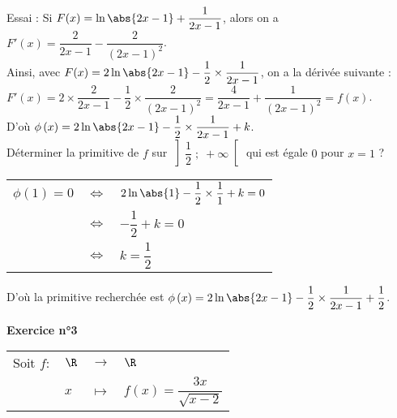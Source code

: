 Essai : Si $F(x) = \ln \abs{2x-1} + \dfrac{1}{2x-1}$, alors on a $F'(x) = \dfrac{2}{2x-1} - \dfrac{2}{\left(2x-1\right)^2}$. \vspace*{.3cm} \\

Ainsi, avec $F(x) = 2\ln\abs{2x-1} - \dfrac{1}{2} \times \dfrac{1}{2x-1}$, on a la dérivée suivante : \vspace*{.3cm} \\

$F'(x) = 2\times \dfrac{2}{2x-1} - \dfrac{1}{2} \times \dfrac{2}{\left(2x-1\right)^2} = \dfrac{4}{2x-1} + \dfrac{1}{\left(2x-1\right)^2} = f(x)$. \vspace*{.3cm} \\

D'où $\phi\left(x\right) = 2\ln\abs{2x-1} - \dfrac{1}{2}\times \dfrac{1}{2x-1} + k$. \vspace*{.3cm} \\

Déterminer la primitive de $f$ sur $\left] \dfrac{1}{2} \; ; \; +\infty\right[$ qui est égale $0$ pour $x = 1$ ? \\

\begin{tabular}{lll}
\hspace*{-.3cm} $\phi\left(1\right) = 0$ & $\Longleftrightarrow$ & $2\ln\abs{1} - \dfrac{1}{2} \times \dfrac{1}{1} + k = 0$ \vspace*{.3cm} \\
& $\Longleftrightarrow$ & $-\dfrac{1}{2} + k = 0$ \vspace*{.3cm} \\
& $\Longleftrightarrow$ & $k = \dfrac{1}{2}$ \\
\end{tabular}

\vspace*{.3cm}

D'où la primitive recherchée est $\phi\left(x\right) = 2\ln\abs{2x-1} - \dfrac{1}{2}\times \dfrac{1}{2x-1} + \dfrac{1}{2}$.

\vspace*{-5cm}

\newpage

\vspace*{-1.7cm}

\textbf{Exercice n°3} \\

\begin{tabular}{llll}
\hspace*{-.3cm} Soit $f:$ & $\R$ & $\longrightarrow$ & $\R$ \\
& $x$ & $\longmapsto$ & $f(x) = \dfrac{3x}{\sqrt{x-2}}$ \\
\end{tabular}

